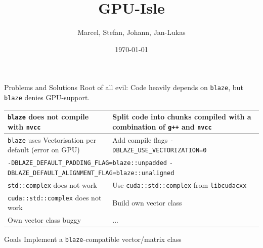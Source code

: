 \documentclass{beamer}
\title{GPU-Isle}
\author{Marcel, Stefan, Johann, Jan-Lukas}
\institute{JSC, JSC, Uni Bonn, ESS}
\date{\today}
\begin{document}
\maketitle

\begin{frame}{Problems and Solutions}
	Root of all evil: Code heavily depends on \texttt{blaze}, but \texttt{blaze} denies GPU-support.\\
	\begin{tabular}{|p{}|p{}|}
		\hline
		\texttt{blaze} does not compile with \texttt{nvcc} & Split code into chunks compiled with a combination of \texttt{g++} and \texttt{nvcc}\\\hline
		\texttt{blaze} uses Vectorisation per default (error on GPU) & Add compile flags \texttt{-DBLAZE\_USE\_VECTORIZATION=0}\\\cline{1-1}
		\multicolumn{2}{|p{0.9\textwidth}|}{\texttt{-DBLAZE\_DEFAULT\_PADDING\_FLAG=blaze::unpadded} \texttt{-DBLAZE\_DEFAULT\_ALIGNMENT\_FLAG=blaze::unaligned}}\\\hline
		\texttt{std::complex} does not work & Use \texttt{cuda::std::complex} from \texttt{libcudacxx} \\\hline
		\texttt{cuda::std::complex} does not work & Build own vector class \\\hline
		Own vector class buggy & ... \\\hline
	\end{tabular}
\end{frame}

\begin{frame}{Goals}
	Implement a \texttt{blaze}-compatible vector/matrix class
\end{frame}
\end{document}
